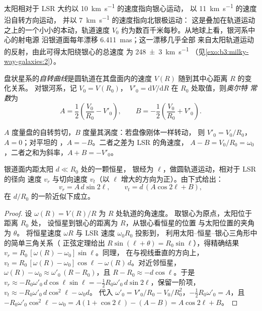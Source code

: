 太阳相对于 LSR 大约以 \qty{10}{km.s^{-1}} 的速度指向银心运动，
以 \qty{11}{km.s^{-1}} 的速度沿自转方向运动，
并以 \qty{7}{km.s^{-1}} 的速度指向北银极运动：
这是叠加在轨道运动之上的一个小小的本动，轨道速度 $V_0$
约为数百千米每秒。从地球上看，银河系中心的射电源
沿银道面每年漂移 \qty{6.411}{mas}；这一漂移几乎全部
来自太阳轨道运动的反射，由此可得太阳绕银心的总速度
为 \qty[separate-uncertainty=true]{248 \pm 3}{km.s^{-1}}
（见\cref{exo:b3:milky-way-galaxies:2}）。

\begin{definition}\label{def:b3:milky-way-galaxies:rotation-curve}
盘状星系的\emph{自转曲线}是圆轨道在其盘面内的速度
$V(R)$ 随到其中心距离 $R$ 的变化关系。
对银河系，记 $V_0 = V(R_0)$，
$V'_0 = \mathrm{d}V/\mathrm{d}R$ 在 $R_0$ 处取值，则\emph{奥尔特
常数}为
\[
A = \frac12\left(\frac{V_0}{R_0} - V'_0\right), \qquad
B = -\frac12\left(\frac{V_0}{R_0} + V'_0\right).
\]
\end{definition}

$A$ 度量盘的自转剪切，$B$ 度量其涡度：若盘像刚体一样转动，
则 $V'_0 = V_0/R_0$，$A = 0$；对平坦的
，$A = -B$。二者之差为 LSR 的角速度，
$A - B = V_0/R_0 = \omega_0$，二者之和为斜率，$A + B = -V'_0$。

\begin{theorem}[奥尔特公式]\label{thm:b3:milky-way-galaxies:oort}
银道面内距太阳 $d \ll R_0$ 处的一颗恒星，
银经为 $\ell$，做圆轨道运动，相对于 LSR 的径向
速度 $v_r$ 与切向速度 $v_t$（以
$\ell$ 增大的方向为正）。由下式给出：
\[
v_r = A\,d\sin 2\ell, \qquad v_t = d\,(A\cos 2\ell + B),
\]
在 $d/R_0$ 的一阶近似下成立。
\end{theorem}

\begin{proof}
设 $\omega(R) = V(R)/R$ 为 $R$ 处轨道的角速度。
取银心为原点，太阳位于距离 $R_0$ 处，
设恒星到银心的距离为 $R$，从银心看恒星的位置
与太阳位置的夹角为 $\theta$。
将恒星速度 $\omega R$ 与 LSR 速度 $\omega_0 R_0$ 投影到，
利用太阳–恒星–银心三角形中的简单三角关系（
正弦定理给出 $R\sin(\ell + \theta) = R_0\sin\ell$），得精确结果
$v_r = R_0\,[\omega(R) - \omega_0]\sin\ell$。同理，
在与视线垂直的方向上，
$v_t = R_0\,[\omega(R) - \omega_0]\cos\ell - \omega(R)\,d$。对近邻恒星，
$\omega(R) - \omega_0 \approx \omega'_0\,(R - R_0)$，且
$R - R_0 \approx -d\cos\ell$。于是
$v_r \approx -R_0\omega'_0\,d\cos\ell\sin\ell = -\tfrac12 R_0\omega'_0\,
d\sin 2\ell$，保留一阶项，
$v_t \approx -R_0\omega'_0\,d\cos^2\ell - \omega_0 d$。
代入 $\omega'_0 = V'_0/R_0 - V_0/R_0^2$，$-\tfrac12 R_0\omega'_0 = A$，且
$-R_0\omega'_0\cos^2\ell - \omega_0 = A(1 + \cos 2\ell) - (A - B) =
A\cos 2\ell + B$。
\end{proof}

